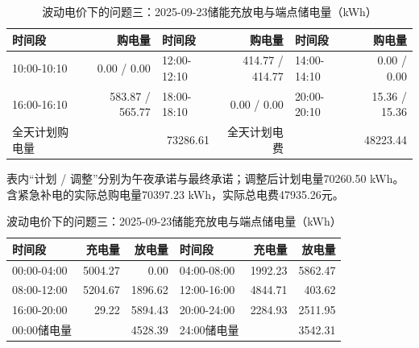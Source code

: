 \begin{table}[H]\centering\small\setlength{\tabcolsep}{5pt}
\caption{波动电价下的问题三：2025-09-23购电结果（电量：kWh；费用：元）}
\begin{tabular}{lrlrlr}\toprule
时间段 & 购电量 & 时间段 & 购电量 & 时间段 & 购电量 \\\midrule
10:00-10:10 & 0.00 / 0.00 & 12:00-12:10 & 414.77 / 414.77 & 14:00-14:10 & 0.00 / 0.00\\
16:00-16:10 & 583.87 / 565.77 & 18:00-18:10 & 0.00 / 0.00 & 20:00-20:10 & 15.36 / 15.36\\
\midrule 全天计划购电量 & \multicolumn{2}{r}{73286.61} & 全天计划电费 & \multicolumn{2}{r}{48223.44}\\\bottomrule
\end{tabular}
\par\vspace{2pt}\footnotesize
表内“计划 / 调整”分别为午夜承诺与最终承诺；调整后计划电量70260.50 kWh。
含紧急补电的实际总购电量70397.23 kWh，实际总电费47935.26元。
\vspace{3pt}\small
\caption{波动电价下的问题三：2025-09-23储能充放电与端点储电量（kWh）}
\begin{tabular}{lrrlrr}\toprule
时间段 & 充电量 & 放电量 & 时间段 & 充电量 & 放电量 \\\midrule
00:00-04:00 & 5004.27 & 0.00 & 04:00-08:00 & 1992.23 & 5862.47\\
08:00-12:00 & 5204.67 & 1896.62 & 12:00-16:00 & 4844.71 & 403.62\\
16:00-20:00 & 29.22 & 5894.43 & 20:00-24:00 & 2284.93 & 2511.95\\
\midrule 00:00储电量 & \multicolumn{2}{r}{4528.39} & 24:00储电量 & \multicolumn{2}{r}{3542.31}\\\bottomrule
\end{tabular}\end{table}
